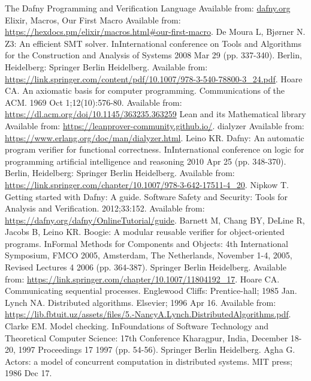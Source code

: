 \begin{thebibliography}{9}
The Dafny Programming and Verification Language
Available from: \url{dafny.org}
Elixir, Macros, Our First Macro
Available from: \url{https://hexdocs.pm/elixir/macros.html#our-first-macro}.
De Moura L, Bjørner N. Z3: An efficient SMT solver. InInternational conference on Tools and Algorithms for the Construction and Analysis of Systems 2008 Mar 29 (pp. 337-340). Berlin, Heidelberg: Springer Berlin Heidelberg.
Available from: \url{https://link.springer.com/content/pdf/10.1007/978-3-540-78800-3_24.pdf}.
Hoare CA. An axiomatic basis for computer programming. Communications of the ACM. 1969 Oct 1;12(10):576-80.
Available from: \url{https://dl.acm.org/doi/10.1145/363235.363259}
Lean and its Mathematical library
Available from: \url{https://leanprover-community.github.io/}.
dialyzer
Available from: \url{https://www.erlang.org/doc/man/dialyzer.html}.
Leino KR. Dafny: An automatic program verifier for functional correctness. InInternational conference on logic for programming artificial intelligence and reasoning 2010 Apr 25 (pp. 348-370). Berlin, Heidelberg: Springer Berlin Heidelberg.
Available from: \url{https://link.springer.com/chapter/10.1007/978-3-642-17511-4_20}.
Nipkow T. Getting started with Dafny: A guide. Software Safety and Security: Tools for Analysis and Verification. 2012;33:152.
Available from: \url{https://dafny.org/dafny/OnlineTutorial/guide}.
Barnett M, Chang BY, DeLine R, Jacobs B, Leino KR. Boogie: A modular reusable verifier for object-oriented programs. InFormal Methods for Components and Objects: 4th International Symposium, FMCO 2005, Amsterdam, The Netherlands, November 1-4, 2005, Revised Lectures 4 2006 (pp. 364-387). Springer Berlin Heidelberg.
Available from: \url{https://link.springer.com/chapter/10.1007/11804192_17}.
Hoare CA. Communicating sequential processes. Englewood Cliffs: Prentice-hall; 1985 Jan.
Lynch NA. Distributed algorithms. Elsevier; 1996 Apr 16.
Available from: \url{https://lib.fbtuit.uz/assets/files/5.-NancyA.Lynch.DistributedAlgorithms.pdf}.
Clarke EM. Model checking. InFoundations of Software Technology and Theoretical Computer Science: 17th Conference Kharagpur, India, December 18-20, 1997 Proceedings 17 1997 (pp. 54-56). Springer Berlin Heidelberg.
Agha G. Actors: a model of concurrent computation in distributed systems. MIT press; 1986 Dec 17.
\end{thebibliography}
